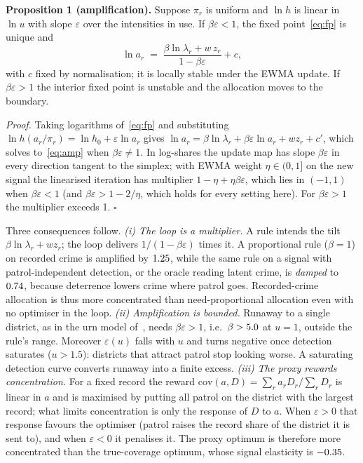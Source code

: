 \textbf{Proposition 1 (amplification).} Suppose $\pi_r$ is uniform and
$\ln h$ is linear in $\ln u$ with slope $\varepsilon$ over the intensities in
use. If $\beta\varepsilon < 1$, the fixed point~\eqref{eq:fp} is unique and
\begin{equation}
\ln a_r \;=\; \frac{\beta \ln\lambda_r + w\,z_r}{1-\beta\varepsilon} + c ,
\label{eq:amp}
\end{equation}
with $c$ fixed by normalisation; it is locally stable under the EWMA update.
If $\beta\varepsilon > 1$ the interior fixed point is unstable and the
allocation moves to the boundary.

\emph{Proof.} Taking logarithms of~\eqref{eq:fp} and substituting
$\ln h(a_r/\pi_r) = \ln h_0 + \varepsilon \ln a_r$ gives
$\ln a_r = \beta\ln\lambda_r + \beta\varepsilon\ln a_r + w z_r + c'$, which
solves to~\eqref{eq:amp} when $\beta\varepsilon \neq 1$. In log-shares the
update map has slope $\beta\varepsilon$ in every direction tangent to the
simplex; with EWMA weight $\eta\in(0,1]$ on the new signal the linearised
iteration has multiplier $1-\eta+\eta\beta\varepsilon$, which lies in $(-1,1)$
when $\beta\varepsilon<1$ (and $\beta\varepsilon > 1-2/\eta$, which holds for
every setting here). For $\beta\varepsilon>1$ the multiplier exceeds 1.
\hfill$\square$

Three consequences follow. \emph{(i) The loop is a multiplier.} A rule intends
the tilt $\beta\ln\lambda_r + w z_r$; the loop delivers $1/(1-\beta\varepsilon)$
times it. A proportional rule ($\beta=1$) on recorded crime is amplified by
$1.25$, while the same rule on a signal with patrol-independent detection,
or the oracle reading latent crime, is \emph{damped} to $0.74$,
because deterrence lowers crime where patrol goes. Recorded-crime allocation is
thus more concentrated than need-proportional allocation even with no optimiser
in the loop. \emph{(ii) Amplification is bounded.} Runaway to a single district,
as in the urn model of~\cite{ensign2018}, needs $\beta\varepsilon>1$, i.e.\
$\beta > 5.0$ at $u=1$, outside the rule's range. Moreover
$\varepsilon(u)$ falls with $u$ and turns negative once detection saturates
($u>1.5$): districts that attract patrol stop looking worse. A saturating
detection curve converts runaway into a finite excess. \emph{(iii) The proxy
rewards concentration.} For a fixed record the reward
$\mathrm{cov}(a,D)=\sum_r a_r D_r/\sum_r D_r$ is linear in $a$ and is maximised
by putting all patrol on the district with the largest record; what limits
concentration is only the response of $D$ to $a$. When $\varepsilon>0$ that
response favours the optimiser (patrol raises the record share of the district
it is sent to), and when $\varepsilon<0$ it penalises it. The proxy optimum is
therefore more concentrated than the true-coverage optimum, whose signal
elasticity is $-0.35$.

